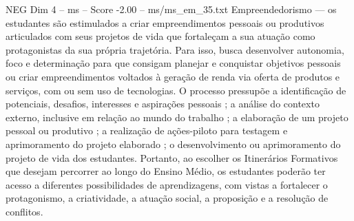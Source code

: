 \begin{textsample}{NEG Dim 4 – ms – Score -2.00 – ms/ms\_em\_35.txt}
Empreendedorismo — os estudantes são estimulados a criar empreendimentos pessoais ou produtivos articulados com seus projetos de vida que fortaleçam a sua atuação como protagonistas da sua própria trajetória.
Para isso, busca desenvolver autonomia, foco e determinação para que consigam planejar e conquistar objetivos pessoais ou criar empreendimentos voltados à geração de renda via oferta de produtos e serviços, com ou sem uso de tecnologias.
O processo pressupõe a identificação de potenciais, desafios, interesses e aspirações pessoais ; a análise do contexto externo, inclusive em relação ao mundo do trabalho ; a elaboração de um projeto pessoal ou produtivo ; a realização de ações-piloto para testagem e aprimoramento do projeto elaborado ; o desenvolvimento ou aprimoramento do projeto de vida dos estudantes.
Portanto, ao escolher os Itinerários Formativos que desejam percorrer ao longo do Ensino Médio, os estudantes poderão ter acesso a diferentes possibilidades de aprendizagens, com vistas a fortalecer o protagonismo, a criatividade, a atuação social, a proposição e a resolução de conflitos.

\end{textsample}
